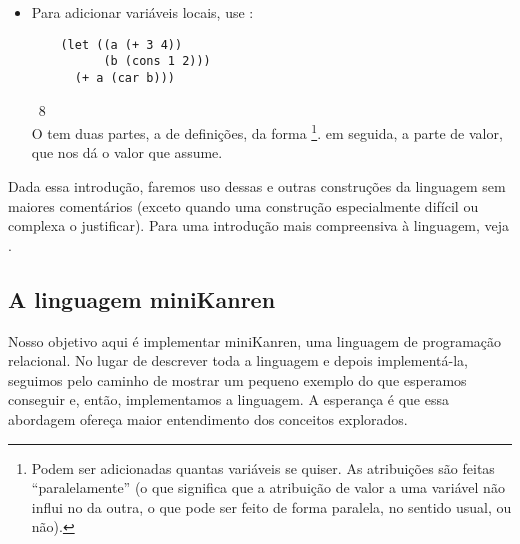 \begin{itemize}
  Podem ser adicionadas quantas cláusulas do tipo
   se quiser (vale notar, elas são
  avaliadas sequencialmente), sendo que a última pode
  opcionalmente ser como , ou .

\item Para adicionar variáveis locais, use :
  \begin{lstlisting}
    (let ((a (+ 3 4))
          (b (cons 1 2)))
      (+ a (car b)))
  \end{lstlisting}
  \hspace{1cm} \seta\ 8\\
  O  tem duas partes, a de definições, da forma
  \footnote{Podem ser adicionadas quantas variáveis se
    quiser. As atribuições são feitas ``paralelamente'' (o que
    significa que a atribuição de valor a uma variável não influi no
    da outra, o que pode ser feito de forma paralela, no sentido usual, ou não).}.
  em seguida, a parte de valor, que nos dá o valor que 
  assume.
\end{itemize}


  

  Dada essa introdução, faremos uso dessas e outras construções da
  linguagem sem maiores comentários (exceto quando uma construção
  especialmente difícil ou complexa o justificar). Para uma introdução
  mais compreensiva à linguagem, veja \cite{kent}.

  \subsection{A linguagem miniKanren}

  Nosso objetivo aqui é implementar miniKanren, uma linguagem de
  programação relacional. No lugar de descrever toda a linguagem e
  depois implementá-la, seguimos pelo caminho de mostrar um pequeno
  exemplo do que esperamos conseguir e, então, implementamos a
  linguagem. A esperança é que essa abordagem ofereça maior
  entendimento dos conceitos explorados.


